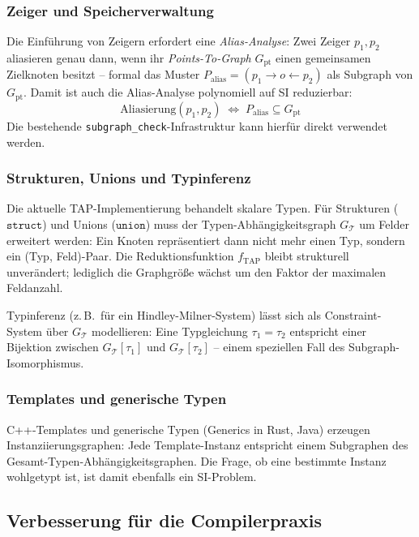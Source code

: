 ﻿\documentclass[a4paper,12pt]{article}
\theoremstyle{definition}
\begin{document}
\subsubsection{Zeiger und Speicherverwaltung}

Die Einführung von Zeigern erfordert eine \emph{Alias-Analyse}: Zwei
Zeiger $p_1, p_2$ aliasieren genau dann, wenn ihr \emph{Points-To-Graph}
$G_{\mathrm{pt}}$ einen gemeinsamen Zielknoten besitzt -- formal das
Muster $P_{\mathrm{alias}} = (p_1 \to o \leftarrow p_2)$ als Subgraph
von $G_{\mathrm{pt}}$. Damit ist auch die Alias-Analyse polynomiell auf
SI reduzierbar:
\[
\text{Aliasierung}(p_1, p_2) \;\Leftrightarrow\;
P_{\mathrm{alias}} \subseteq G_{\mathrm{pt}}
\]
Die bestehende \texttt{subgraph\_check}-Infrastruktur kann hierfür direkt
verwendet werden.

\subsubsection{Strukturen, Unions und Typinferenz}

Die aktuelle TAP-Implementierung behandelt skalare Typen. Für Strukturen
($\mathtt{struct}$) und Unions ($\mathtt{union}$) muss der
Typen-Abhängigkeitsgraph $G_{\mathcal{T}}$ um Felder erweitert werden:
Ein Knoten repräsentiert dann nicht mehr einen Typ, sondern ein
(Typ, Feld)-Paar. Die Reduktionsfunktion $f_{\mathrm{TAP}}$ bleibt
strukturell unverändert; lediglich die Graphgröße wächst um den Faktor
der maximalen Feldanzahl.

Typinferenz (z.\,B.\ für ein Hindley-Milner-System) lässt sich als
Constraint-System über $G_{\mathcal{T}}$ modellieren: Eine
Typgleichung $\tau_1 = \tau_2$ entspricht einer Bijektion zwischen
$G_{\mathcal{T}}[\tau_1]$ und $G_{\mathcal{T}}[\tau_2]$ -- einem
speziellen Fall des Subgraph-Isomorphismus.

\subsubsection{Templates und generische Typen}

C++-Templates und generische Typen (Generics in Rust, Java) erzeugen
Instanziierungsgraphen: Jede Template-Instanz entspricht einem
Subgraphen des Gesamt-Typen-Abhängigkeitsgraphen. Die Frage, ob eine
bestimmte Instanz wohlgetypt ist, ist damit ebenfalls ein SI-Problem.

\subsection{Verbesserung für die Compilerpraxis}
\label{sec:ausblick-algo}
\end{document}
